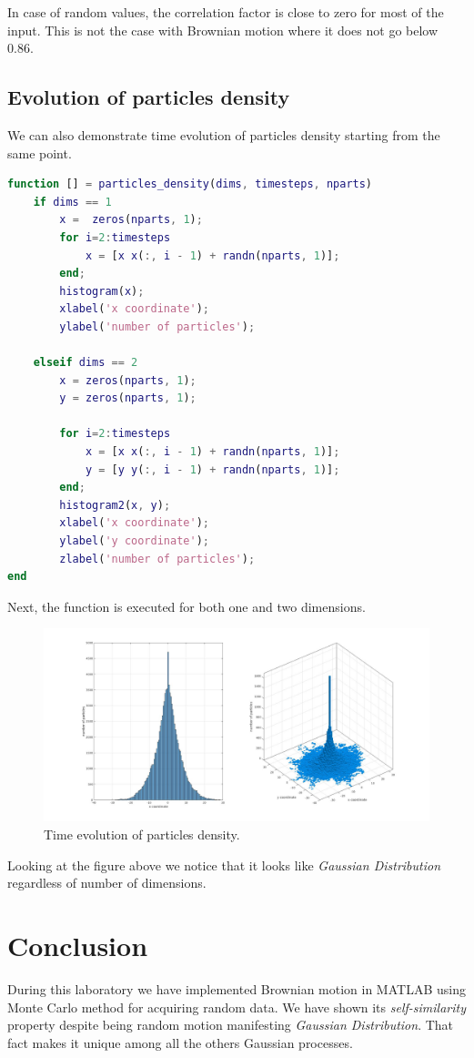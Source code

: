 \documentclass[12pt]{article}
\begin{document}
In case of random values, the correlation factor is close to zero for most of the input. This is not the case with Brownian motion where it does not go below 0.86.

\subsection{Evolution of particles density}

We can also demonstrate time evolution of particles density starting from the same point.

\begin{lstlisting}[language=Matlab, caption = {Source code for particles density}]
function [] = particles_density(dims, timesteps, nparts)
	if dims == 1
		x =  zeros(nparts, 1);
		for i=2:timesteps
			x = [x x(:, i - 1) + randn(nparts, 1)];
		end;
		histogram(x);
		xlabel('x coordinate');
		ylabel('number of particles');

	elseif dims == 2
		x = zeros(nparts, 1);
		y = zeros(nparts, 1);

		for i=2:timesteps
			x = [x x(:, i - 1) + randn(nparts, 1)];
			y = [y y(:, i - 1) + randn(nparts, 1)];
		end;
		histogram2(x, y);
		xlabel('x coordinate');
		ylabel('y coordinate');
		zlabel('number of particles');
end
\end{lstlisting}

Next, the function is executed for both one and two dimensions.

\begin{figure}[H]
	\centering
	\includegraphics[width=1.2\textwidth]{particles_density}
	\caption{Time evolution of particles density.}
\end{figure}

Looking at the figure above we notice that it looks like \textit{Gaussian Distribution} regardless of number of dimensions.


\section{Conclusion}

During this laboratory we have implemented Brownian motion in MATLAB using Monte Carlo method for acquiring random data. We have shown its \textit{self-similarity} property despite being random motion manifesting \textit{Gaussian Distribution}. That fact makes it unique among all the others Gaussian processes.
\end{document}
